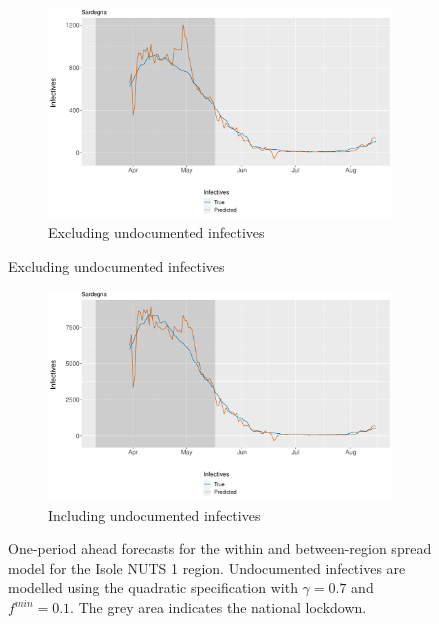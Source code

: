 \documentclass[12pt]{article}
\begin{document}
\begin{appendices}
        \begin{figure}[H]
    	    \centering
    	    \begin{subfigure}{\textwidth}
    	      \centering
    	      \includegraphics[width=0.91\linewidth]{output/model_between_lag14_forecast_start20_Isole_rolling.pdf}
    	      \caption{Excluding undocumented infectives}
    	      \label{fig:forecast_between_isole_regular}
    	    \end{subfigure}
        \end{figure}
        \begin{figure}[H]\ContinuedFloat
    	    \begin{subfigure}{\textwidth}
    	      \centering
    	      \includegraphics[width=0.91\linewidth]{output/model_between_lag14_forecast_start20_Isole_UndocQuadratic_rolling.pdf}
    	      \caption{Including undocumented infectives}
    	      \label{fig:forecast_between_isole_undoc}
    	    \end{subfigure}
    	    \caption{One-period ahead forecasts for the within and between-region spread model for the Isole NUTS 1 region. Undocumented infectives are modelled using the quadratic specification with $\gamma = 0.7$ and $f^{min}=0.1$. The grey area indicates the national lockdown.}
    	    \label{fig:forecast_between_isole}
        \end{figure}
		

\end{appendices}
\end{document}
